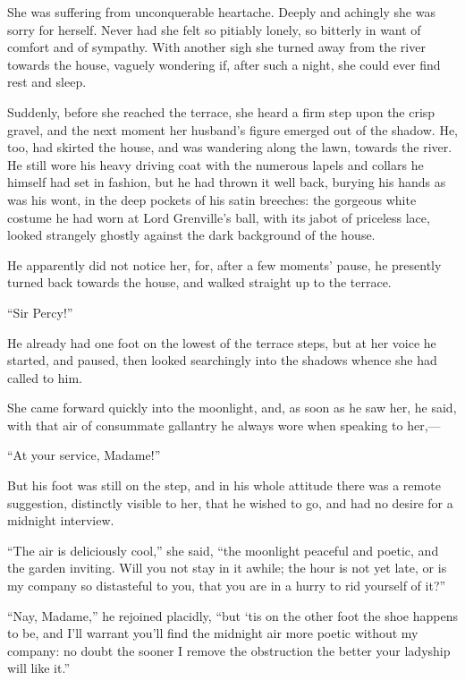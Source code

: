 \documentclass[paper=a5,BCOR=7mm,twoside,DIV=calc,12pt,usegeometry,chapterprefix,endperiod,headings=big]{scrbook}
\begin{document}
She was suffering from unconquerable heartache. Deeply and achingly she was sorry for herself. Never had she felt so pitiably lonely, so bitterly in want of comfort and of sympathy. With another sigh she turned away from the river towards the house, vaguely wondering if, after such a night, she could ever find rest and sleep.

Suddenly, before she reached the terrace, she heard a firm step upon the crisp gravel, and the next moment her husband's figure emerged out of the shadow. He, too, had skirted the house, and was wandering along the lawn, towards the river. He still wore his heavy driving coat with the numerous lapels and collars he himself had set in fashion, but he had thrown it well back, burying his hands as was his wont, in the deep pockets of his satin breeches: the gorgeous white costume he had worn at Lord Grenville's ball, with its jabot of priceless lace, looked strangely ghostly against the dark background of the house.

He apparently did not notice her, for, after a few moments’ pause, he presently turned back towards the house, and walked straight up to the terrace.

\enquote{Sir Percy!}

He already had one foot on the lowest of the terrace steps, but at her voice he started, and paused, then looked searchingly into the shadows whence she had called to him.

She came forward quickly into the moonlight, and, as soon as he saw her, he said, with that air of consummate gallantry he always wore when speaking to her,---

\enquote{At your service, Madame!}

But his foot was still on the step, and in his whole attitude there was a remote suggestion, distinctly visible to her, that he wished to go, and had no desire for a midnight interview.

\enquote{The air is deliciously cool,} she said, \enquote{the moonlight peaceful and poetic, and the garden inviting. Will you not stay in it awhile; the hour is not yet late, or is my company so distasteful to you, that you are in a hurry to rid yourself of it?}

\enquote{Nay, Madame,} he rejoined placidly, \enquote{but `tis on the other foot the shoe happens to be, and I'll warrant you'll find the midnight air more poetic without my company: no doubt the sooner I remove the obstruction the better your ladyship will like it.}
\end{document}
